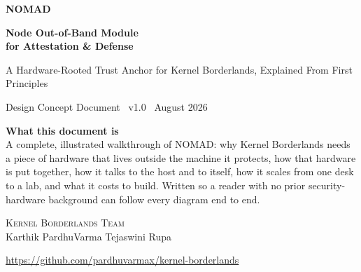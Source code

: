 \documentclass[11pt,a4paper]{article}
\begin{document}
\begin{titlepage}
\thispagestyle{empty}
\centering
\vspace*{\fill}

{\small{}}

\vspace{1.6cm}

{\fontsize{34}{40}\selectfont\bfseries NOMAD}

\vspace{0.6em}

{\Large\bfseries Node Out-of-Band Module\\[0.15em] for Attestation \& Defense}

\vspace{0.9em}

{\normalsize A Hardware-Rooted Trust Anchor for Kernel Borderlands, Explained From First Principles}

\vspace{1.2cm}

{\small Design Concept Document \textbullet\ v1.0 \textbullet\ August 2026}

\vspace*{\fill}

\begin{minipage}{0.82\linewidth}
\centering
\small
\textbf{What this document is} \\[0.3em]
A complete, illustrated walkthrough of NOMAD: why Kernel Borderlands needs a
piece of hardware that lives outside the machine it protects, how that
hardware is put together, how it talks to the host and to itself, how it
scales from one desk to a lab, and what it costs to build. Written so a
reader with no prior security-hardware background can follow every
diagram end to end.
\end{minipage}

\vspace{1.4cm}

{\small \scshape Kernel Borderlands Team}\\[0.9em]
\small Karthik \hspace{0.5cm}\textbullet\hspace{0.5cm} PardhuVarma \hspace{0.5cm}\textbullet\hspace{0.5cm} Tejaswini \hspace{0.5cm}\textbullet\hspace{0.5cm} Rupa

\vspace{0.9em}
{\small \url{https://github.com/pardhuvarmax/kernel-borderlands}}

\vspace{1.5cm}
\end{titlepage}
\end{document}
